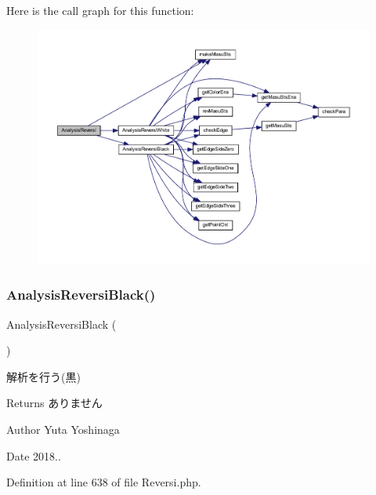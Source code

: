 Here is the call graph for this function\+:\nopagebreak
\begin{figure}[H]
\begin{center}
\leavevmode
\includegraphics[width=350pt]{class_reversi_ae15e49622562732d31d44a75a14c3b45_cgraph}
\end{center}
\end{figure}
\mbox{\label{class_reversi_a471972ec549188f7eb701d57e14ae7a1}} 
\subsubsection{\texorpdfstring{Analysis\+Reversi\+Black()}{AnalysisReversiBlack()}}
{\footnotesize\ttfamily Analysis\+Reversi\+Black (\begin{DoxyParamCaption}{ }\end{DoxyParamCaption})\hspace{0.3cm}{\ttfamily [private]}}



解析を行う(黒) 

\begin{DoxyReturn}{Returns}
ありません 
\end{DoxyReturn}
\begin{DoxyAuthor}{Author}
Yuta Yoshinaga 
\end{DoxyAuthor}
\begin{DoxyDate}{Date}
2018.. 
\end{DoxyDate}


Definition at line 638 of file Reversi.\+php.




